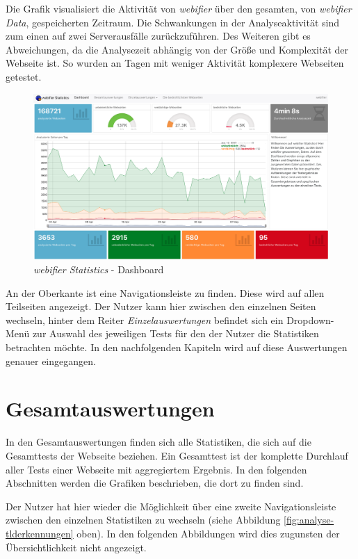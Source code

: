 Die Grafik visualisiert die Aktivität von \textit{webifier} über den gesamten, von \textit{webifier Data}, gespeicherten Zeitraum. Die Schwankungen in der Analyseaktivität sind zum einen auf zwei Serverausfälle zurückzuführen. Des Weiteren gibt es Abweichungen, da die Analysezeit abhängig von der Größe und Komplexität der Webseite ist. So wurden an Tagen mit weniger Aktivität komplexere Webseiten getestet.
\begin{figure}[H]
  \centering
  \includegraphics[width=\textwidth]{images/stats/dashboard}
  \caption[\textit{webifier Statistics} - Dashboard]{\textit{webifier Statistics} - Dashboard\protect\footnotemark}
  \label{fig:analyse-dashboard}
\end{figure}

An der Oberkante ist eine Navigationsleiste zu finden. Diese wird auf allen Teilseiten angezeigt. Der Nutzer kann hier zwischen den einzelnen Seiten wechseln, hinter dem Reiter \textit{Einzelauswertungen} befindet sich ein Dropdown-Menü zur Auswahl des jeweiligen Tests für den der Nutzer die Statistiken betrachten möchte. In den nachfolgenden Kapiteln wird auf diese Auswertungen genauer eingegangen.

\section{Gesamtauswertungen}
In den Gesamtauswertungen finden sich alle Statistiken, die sich auf die Gesamttests der Webseite beziehen. Ein Gesamttest ist der komplette Durchlauf aller Tests einer Webseite mit aggregiertem Ergebnis. In den folgenden Abschnitten werden die Grafiken beschrieben, die dort zu finden sind.

Der Nutzer hat hier wieder die Möglichkeit über eine zweite Navigationsleiste zwischen den einzelnen
Statistiken zu wechseln (siehe Abbildung \ref{fig:analyse-tlderkennungen} oben). In den folgenden
Abbildungen wird dies zugunsten der Übersichtlichkeit nicht angezeigt.

